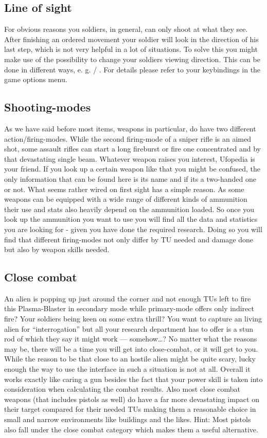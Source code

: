 \subsection{Line of sight}
For obvious reasons you soldiers, in general, can only shoot at what they see. After finishing an ordered movement your soldier will look in the direction of his last step, which is not very helpful in a lot of situations. To solve this you might make use of the possibility to change your soldiers viewing direction. This can be done in different ways, e. g.  / . For details please refer to your keybindings in the game options menu.

\subsection{Shooting-modes}
As we have said before most items, weapons in particular, do have two different action/firing-modes. While the second firing-mode of a sniper rifle is an aimed shot, some assault rifles can start a long fireburst or fire one concentrated and by that devastating single beam. Whatever weapon raises you interest, Ufopedia is your friend. If you look up a certain weapon like that you might be confused, the only information that can be found here is its name and if its a two-handed one or not. What seems rather wired on first sight has a simple reason. As some weapons can be equipped with a wide range of different kinds of ammunition their use and stats also heavily depend on the ammunition loaded. So once you look up the ammunition you want to use you will find all the data and statistics you are looking for - given you have done the required research. Doing so you will find that different firing-modes not only differ by TU needed and damage done but also by weapon skills needed.

\subsection{Close combat}
An alien is popping up just around the corner and not enough TUs left to fire this Plasma-Blaster in secondary mode while primary-mode offers only indirect fire? Your soldiers being keen on some extra thrill? You want to capture an living alien for ``interrogation'' but all your research department has to offer is a stun rod of which they say it might work --- somehow\ldots? No matter what the reasons may be, there will be a time you will get into close-combat, or it will get to you. While the reason to be that close to an hostile alien might be quite scary, lucky enough the way to use the interface in such a situation is not at all. Overall it works exactly like caring a gun besides the fact that your power skill is taken into consideration when calculating the combat results. Also most close combat weapons (that includes pistols as well) do have a far more devastating impact on their target compared for their needed TUs making them a reasonable choice in small and narrow environments like buildings and the likes. Hint: Most pistols also fall under the close combat category which makes them a useful alternative.


